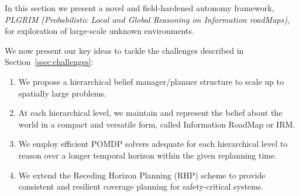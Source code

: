 \documentclass[letterpaper]{article} %
\newcommand{\phdone}[1]{} %
\begin{document}
\phdone{Framework Overview}



In this section we present a novel and field-hardened autonomy framework, \textit{PLGRIM (Probabilistic Local and Global Reasoning on Information roadMaps)}, for exploration of large-scale unknown environments.

We now present our key ideas to tackle the challenges described in Section~\ref{ssec:challenges}:


\vspace{-4pt}
\begin{enumerate}[label={\arabic*)}]
  \itemsep0em 
  \setlength{\itemsep}{0pt}
  \setlength{\parskip}{0pt}
  \item \label{en:idea1} We propose a hierarchical belief manager/planner structure to scale up to spatially large problems.
  \item \label{en:idea2} At each hierarchical level, we maintain and represent the belief about the world in a compact and versatile form, called Information RoadMap  or IRM.
  \item \label{en:idea3} We employ efficient POMDP solvers adequate for each hierarchical level to reason over a longer temporal horizon within the given replanning time.
  \item \label{en:idea4} We extend the Receding Horizon Planning (RHP) scheme to provide consistent and resilient coverage planning for safety-critical systems.
\end{enumerate}
\vspace{-4pt}

\end{document}
